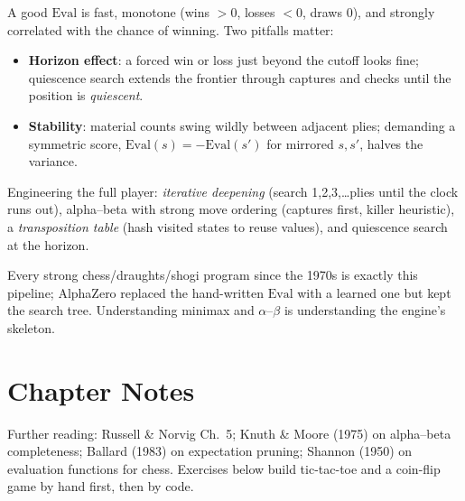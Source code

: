A good $\text{Eval}$ is fast, monotone (wins $>0$, losses $<0$, draws $0$), and strongly correlated with the chance of winning. Two pitfalls matter:
\begin{itemize}
    \item \textbf{Horizon effect}: a forced win or loss just beyond the cutoff looks fine; quiescence search extends the frontier through captures and checks until the position is \emph{quiescent}.
    \item \textbf{Stability}: material counts swing wildly between adjacent plies; demanding a symmetric score, $\text{Eval}(s)=-\text{Eval}(s')$ for mirrored $s,s'$, halves the variance.
\end{itemize}

Engineering the full player: \emph{iterative deepening} (search 1,2,3,\dots plies until the clock runs out), alpha--beta with strong move ordering (captures first, killer heuristic), a \emph{transposition table} (hash visited states to reuse values), and quiescence search at the horizon.

\begin{remark}
Every strong chess/draughts/shogi program since the 1970s is exactly this pipeline; AlphaZero replaced the hand-written $\text{Eval}$ with a learned one but kept the search tree. Understanding minimax and $\alpha$--$\beta$ is understanding the engine's skeleton.
\end{remark}

\section{Chapter Notes}
Further reading: Russell \& Norvig Ch.~5; Knuth \& Moore (1975) on alpha--beta completeness; Ballard (1983) on expectation pruning; Shannon (1950) on evaluation functions for chess. Exercises below build tic-tac-toe and a coin-flip game by hand first, then by code.

